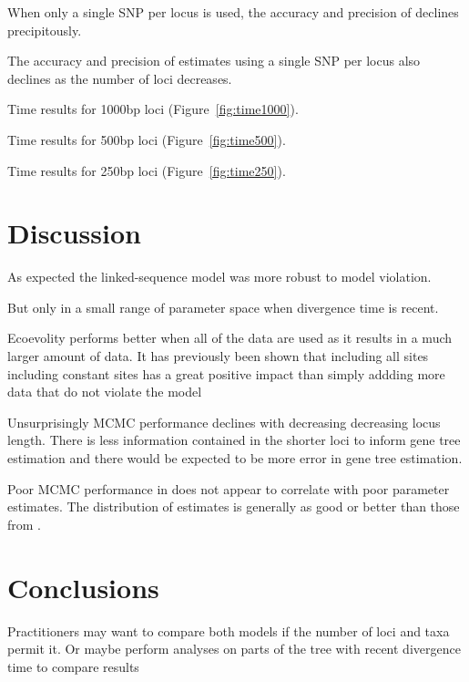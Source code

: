 When only a single SNP per locus is used, the accuracy and precision of \ecoevolity 
declines precipitously.

The accuracy and precision of \ecoevolity estimates using a single SNP per locus 
also declines as the number of loci decreases.        
















Time results for 1000bp loci (Figure~\ref{fig:time1000}).

Time results for 500bp loci (Figure~\ref{fig:time500}).

Time results for 250bp loci (Figure~\ref{fig:time250}).

\section{Discussion}

As expected the linked-sequence model was more robust to model violation.

But only in a small range of parameter space when divergence time is recent.

Ecoevolity performs better when all of the data are used as it results in a much larger 
amount of data. It has previously been shown that including all sites including 
constant sites has a great positive impact than simply addding more data that 
do not violate the model \citep{Oaks2018ecoevolity}

Unsurprisingly MCMC performance declines with decreasing decreasing locus length.
There is less information contained in the shorter loci to inform gene tree estimation 
and there would be expected to be more error in gene tree estimation.

Poor MCMC performance in \beast does not appear to correlate with poor parameter 
estimates. The distribution of estimates is generally as good or better than those 
from \ecoevolity. 


\section{Conclusions}

Practitioners may want to compare both models if the number of loci and taxa
permit it. Or maybe perform analyses on parts of the tree with recent divergence
time to compare results 
